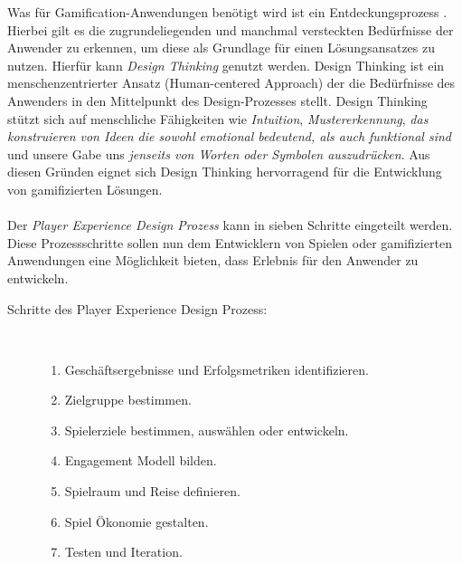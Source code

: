 \documentclass[a4paper,12pt]{scrartcl}
\begin{document}
Was für Gamification-Anwendungen benötigt wird ist ein Entdeckungsprozess \cite{gamificationDefinition}. Hierbei gilt es die zugrundeliegenden und manchmal versteckten Bedürfnisse der Anwender zu erkennen, um diese als Grundlage für einen Lösungsansatzes zu nutzen. Hierfür kann \textit{Design Thinking} genutzt werden. Design Thinking ist ein menschenzentrierter Ansatz (Human-centered Approach) der die Bedürfnisse des Anwenders in den Mittelpunkt des Design-Prozesses stellt. Design Thinking stützt sich auf menschliche Fähigkeiten wie \textit{Intuition}, \textit{Mustererkennung}, \textit{das konstruieren von Ideen die sowohl emotional bedeutend, als auch funktional sind} und unsere Gabe uns \textit{jenseits von Worten oder Symbolen auszudrücken}. Aus diesen Gründen eignet sich Design Thinking hervorragend für die Entwicklung von gamifizierten Lösungen.
\\\\
Der \textit{Player Experience Design Prozess} kann in sieben Schritte eingeteilt werden. Diese Prozessschritte sollen nun dem Entwicklern von Spielen oder gamifizierten Anwendungen eine Möglichkeit bieten, dass Erlebnis für den Anwender zu entwickeln.
\begin{description}
   \item[Schritte des Player Experience Design Prozess:]~\par
   \begin{enumerate}
      \item Geschäftsergebnisse und Erfolgsmetriken identifizieren.
      \item Zielgruppe bestimmen.
      \item Spielerziele bestimmen, auswählen oder entwickeln.
      \item Engagement Modell bilden.
      \item Spielraum und Reise definieren.
      \item Spiel Ökonomie gestalten.
      \item Testen und Iteration.
   \end{enumerate}
\end{description}
\end{document}
